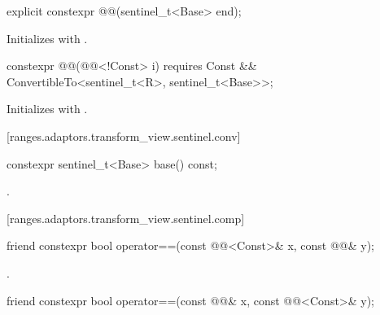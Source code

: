 \begin{itemdecl}
explicit constexpr @@(sentinel_t<Base> end);
\end{itemdecl}

\begin{itemdescr}
\pnum
\effects Initializes  with .
\end{itemdescr}

\begin{itemdecl}
constexpr @@(@@<!Const> i)
requires Const && ConvertibleTo<sentinel_t<R>, sentinel_t<Base>>;
\end{itemdecl}

\begin{itemdescr}
\pnum
\effects Initializes  with .
\end{itemdescr}

[ranges.adaptors.transform_view.sentinel.conv]{}

\begin{itemdecl}
constexpr sentinel_t<Base> base() const;
\end{itemdecl}

\begin{itemdescr}
\pnum
\returns {}.
\end{itemdescr}

[ranges.adaptors.transform_view.sentinel.comp]{}

\begin{itemdecl}
friend constexpr bool operator==(const @@<Const>& x, const @@& y);
\end{itemdecl}

\begin{itemdescr}
\pnum
\returns {}.
\end{itemdescr}

\begin{itemdecl}
friend constexpr bool operator==(const @@& x, const @@<Const>& y);
\end{itemdecl}

